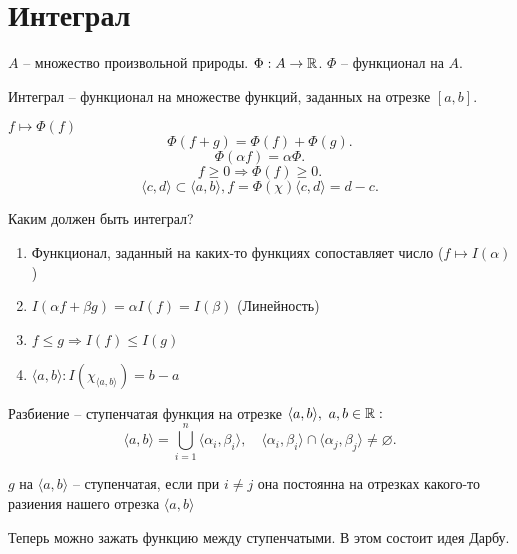 \documentclass[12pt]{report}
\begin{document}
\section{Интеграл}
\begin{defn}
    $ A$ -- множество произвольной природы. $ \Phi: A \to  \mathbb{R}$. $ \Phi$ -- функционал на $ A$. 
\end{defn}
\begin{defn}
    Интеграл -- функционал на множестве функций, заданных на отрезке $ [a, b]$.

    $ f \mapsto \Phi (f)$
    \[
	\Phi(f+g) = \Phi(f) + \Phi(g)
    .\] 
    \[
	\Phi( \alpha  f) = \alpha \Phi
    .\] 
    \[
	 f \ge  0 \Longrightarrow \Phi(f) \ge 0
    .\] 
    \[
	\langle c, d \rangle \subset \langle a, b \rangle, f= \Phi(\chi)  \langle c, d \rangle = d - c
    .\] 
\end{defn}
\begin{st}
    Каким должен быть интеграл?
    \begin{enumerate}
	\item Функционал, заданный на каких-то функциях сопоставляет число ($ f \mapsto I( \alpha )$)
	\item $ I( \alpha  f + \beta  g) = \alpha I(f) = I ( \beta ) $ (Линейность)
	\item $ f \le  g \Longrightarrow I(f) \le  I(g)$
	\item $  \langle a, b \rangle: I(\chi _{ \langle a, b \rangle} ) = b - a$
    \end{enumerate}
\end{st}
\begin{defn}
    Разбиение -- ступенчатая функция на отрезке $ \langle a, b \rangle, ~ a, b \in  \mathbb{R}:$
    \[
	\langle a, b \rangle = \bigcup_{i= 1}^{n} \langle \alpha _i, \beta _i \rangle, \quad \langle \alpha_i , \beta _i \rangle\cap \langle \alpha _j, \beta _j \rangle  \ne \varnothing
    .\] 
\end{defn}
\begin{defn}
    $ g $  на $ \langle a, b \rangle$ -- ступенчатая, если при $ i \ne j$ она постоянна  на отрезках какого-то разиения нашего отрезка $ \langle a, b \rangle$
\end{defn}
Теперь можно зажать функцию между ступенчатыми. В этом состоит идея Дарбу.
\end{document}
